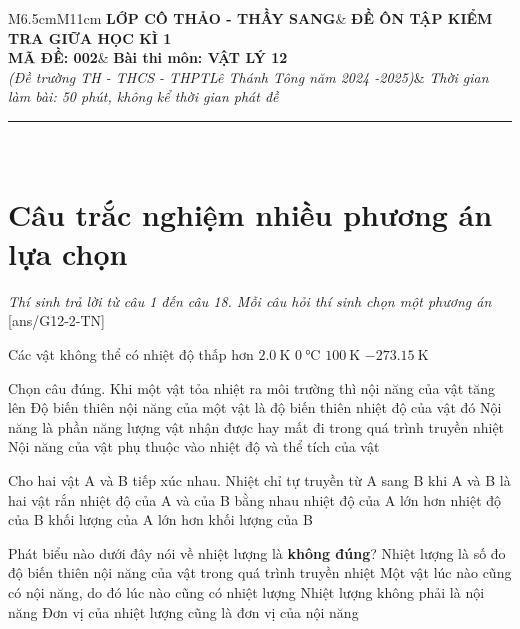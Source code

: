 \begin{tabular}{M{6.5cm}M{11cm}}
	\textbf{LỚP CÔ THẢO - THẦY SANG}& \textbf{ĐỀ ÔN TẬP KIỂM TRA GIỮA HỌC KÌ 1}\\
	\textbf{MÃ ĐỀ: 002}& \textbf{Bài thi môn: VẬT LÝ 12}\\
	\textit{(Đề trường TH - THCS - THPT\newline Lê Thánh Tông năm 2024 -2025)}& \textit{Thời gian làm bài: 50 phút, không kể thời gian phát đề}
	
	\noindent\rule{4cm}{0.8pt} \\
\end{tabular}
\setcounter{section}{0}
\section{Câu trắc nghiệm nhiều phương án lựa chọn}
\textit{Thí sinh trả lời từ câu 1 đến câu 18. Mỗi câu hỏi thí sinh chọn một phương án}
\setcounter{ex}{0}
[ans/G12-2-TN]
\begin{ex}
	Các vật không thể có nhiệt độ thấp hơn
	\choice
	{$\SI{2.0}{\kelvin}$}
	{$\SI{0}{\celsius}$}
	{$\SI{100}{\kelvin}$}
	{\True $\SI{-273.15}{\kelvin}$}
	\loigiai{}
\end{ex}
\begin{ex}
	Chọn câu đúng.	
	\choice
	{Khi một vật tỏa nhiệt ra môi trường thì nội năng của vật tăng lên}
	{Độ biến thiên nội năng của một vật là độ biến thiên nhiệt độ của vật đó}
	{\True Nội năng là phần năng lượng vật nhận được hay mất đi trong quá trình truyền nhiệt}
	{Nội năng của vật phụ thuộc vào nhiệt độ và thể tích của vật}
	\loigiai{}
\end{ex}
\begin{ex}
	Cho hai vật A và B tiếp xúc nhau. Nhiệt chỉ tự truyền từ A sang B khi
	\choice
	{A và B là hai vật rắn}
	{nhiệt độ của A và của B bằng nhau}
	{\True nhiệt độ của A lớn hơn nhiệt độ của B}
	{khối lượng của A lớn hơn khối lượng của B}
	\loigiai{}
\end{ex}
\begin{ex}
	Phát biểu nào dưới đây nói về nhiệt lượng là \textbf{không đúng}?	
	\choice
	{Nhiệt lượng là số đo độ biến thiên nội năng của vật trong quá trình truyền nhiệt}
	{\True Một vật lúc nào cũng có nội năng, do đó lúc nào cũng có nhiệt lượng}
	{Nhiệt lượng không phải là nội năng}
	{Đơn vị của nhiệt lượng cũng là đơn vị của nội năng}
	\loigiai{}
\end{ex}
